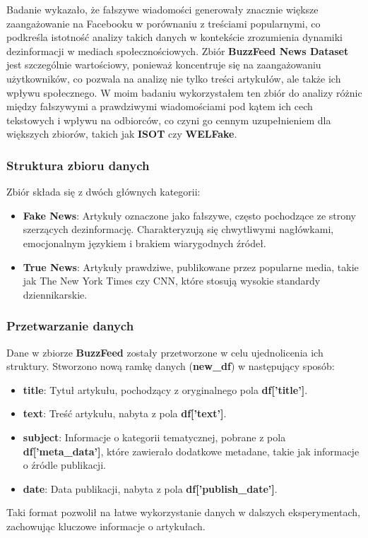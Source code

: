 Badanie \cite{BuzzFace} wykazało, że fałszywe wiadomości generowały znacznie większe zaangażowanie na Facebooku w porównaniu z treściami popularnymi, co podkreśla istotność analizy takich danych w kontekście zrozumienia dynamiki dezinformacji w mediach społecznościowych. Zbiór \textbf{BuzzFeed News Dataset} jest szczególnie wartościowy, ponieważ koncentruje się na zaangażowaniu użytkowników, co pozwala na analizę nie tylko treści artykułów, ale także ich wpływu społecznego. W moim badaniu wykorzystałem ten zbiór do analizy różnic między fałszywymi a prawdziwymi wiadomościami pod kątem ich cech tekstowych i wpływu na odbiorców, co czyni go cennym uzupełnieniem dla większych zbiorów, takich jak \textbf{ISOT} czy \textbf{WELFake}.

\subsubsection{Struktura zbioru danych}
Zbiór składa się z dwóch głównych kategorii:
\begin{itemize}
	\item \textbf{Fake News}: Artykuły oznaczone jako fałszywe, często pochodzące ze strony szerzących dezinformację. Charakteryzują się chwytliwymi nagłówkami, emocjonalnym językiem i brakiem wiarygodnych źródeł.
	\item \textbf{True News}: Artykuły prawdziwe, publikowane przez popularne media, takie jak The New York Times czy CNN, które stosują wysokie standardy dziennikarskie.
\end{itemize}

\subsubsection{Przetwarzanie danych}
Dane w zbiorze \textbf{BuzzFeed} zostały przetworzone w celu ujednolicenia ich struktury. Stworzono nową ramkę danych (\textbf{new\_df}) w następujący sposób:
\begin{itemize}
	\item \textbf{title}: Tytuł artykułu, pochodzący z oryginalnego pola \textbf{df['title']}.
	\item \textbf{text}: Treść artykułu, nabyta z pola \textbf{df['text']}.
	\item \textbf{subject}: Informacje o kategorii tematycznej, pobrane z pola \textbf{df['meta\_data']}, które zawierało dodatkowe metadane, takie jak informacje o źródle publikacji.
	\item \textbf{date}: Data publikacji, nabyta z pola \textbf{df['publish\_date']}.
\end{itemize}
Taki format pozwolił na łatwe wykorzystanie danych w dalszych eksperymentach, zachowując kluczowe informacje o artykułach.


